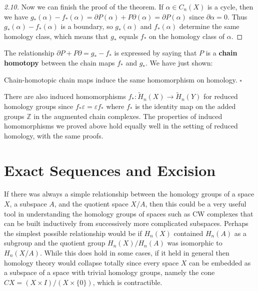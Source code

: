 \begin{proof}[2.10]
Now we can finish the proof of the theorem. If $\alpha \in C_n(X)$ is a cycle, then we
have $g_*(\alpha) - f_*(\alpha) = \partial P(\alpha) + P\partial(\alpha) = \partial P(\alpha)$ since $\partial\alpha = 0$. Thus $g_*(\alpha) - f_*(\alpha)$ is
a boundary, so $g_*(\alpha)$ and $f_*(\alpha)$ determine the same homology class, which means
that $g_*$ equals $f_*$ on the homology class of $\alpha$.
\end{proof}
The relationship $\partial P + P\partial = g_* - f_*$ is expressed by saying that $P$ is a \textbf{chain homotopy}
between the chain maps $f_*$ and $g_*$. We have just shown:

\begin{proposition}
\label{prop:chain-homotopic-maps-induce-same-homology-map}
Chain-homotopic chain maps induce the same homomorphism on
homology. $\square$
\end{proposition}

There are also induced homomorphisms $f_*:\tilde H_n(X) \to \tilde H_n(Y)$ for reduced homology groups since $f_*\varepsilon = \varepsilon f_*$ where $f_*$ is the identity map on the added groups $\mathbb{Z}$ in the
augmented chain complexes. The properties of induced homomorphisms we proved
above hold equally well in the setting of reduced homology, with the same proofs.

\section*{Exact Sequences and Excision}

If there was always a simple relationship between the homology groups of a space
$X$, a subspace $A$, and the quotient space $X/A$, then this could be a very useful tool
in understanding the homology groups of spaces such as CW complexes that can be
built inductively from successively more complicated subspaces. Perhaps the simplest
possible relationship would be if $H_n(X)$ contained $H_n(A)$ as a subgroup and the
quotient group $H_n(X)/H_n(A)$ was isomorphic to $H_n(X/A)$. While this does hold
in some cases, if it held in general then homology theory would collapse totally since
every space $X$ can be embedded as a subspace of a space with trivial homology groups,
namely the cone $CX = (X \times I)/(X \times \{0\})$, which is contractible.

